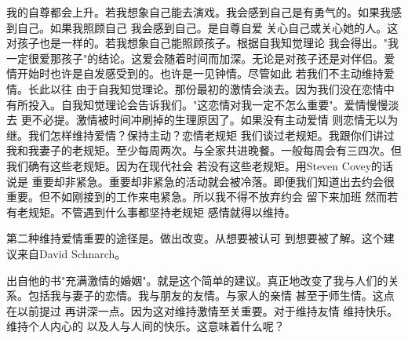 我的自尊都会上升。若我想象自己能去演戏。我会感到自己是有勇气的。如果我感到自己。如果我照顾自己 我会感到自己。是自尊自爱 关心自己或关心她的人。这对孩子也是一样的。若我想象自己能照顾孩子。根据自我知觉理论 我会得出。"我一定很爱那孩子"的结论。这爱会随着时间而加深。无论是对孩子还是对伴侣。爱情开始时也许是自发感受到的。也许是一见钟情。尽管如此 若我们不主动维持爱情。长此以往 由于自我知觉理论。那份最初的激情会淡去。因为我们没在恋情中有所投入。自我知觉理论会告诉我们。"这恋情对我一定不怎么重要"。爱情慢慢淡去 更不必提。激情被时间冲刷掉的生理原因了。如果没有主动爱情 则恋情无以为继。我们怎样维持爱情？保持主动？恋情老规矩 我们谈过老规矩。我跟你们讲过我和我妻子的老规矩。至少每周两次。与全家共进晚餐。一般每周会有三四次。但我们确有这些老规矩。因为在现代社会 若没有这些老规矩。用Steven Covey的话说是 重要却非紧急。重要却非紧急的活动就会被冷落。即便我们知道出去约会很重要。但不如刚接到的工作来电紧急。所以我不得不放弃约会 留下来加班 然而若有老规矩。不管遇到什么事都坚持老规矩 感情就得以维持。 

第二种维持爱情重要的途径是。做出改变。从想要被认可 到想要被了解。这个建议来自David Schnarch。 

出自他的书"充满激情的婚姻"。就是这个简单的建议。真正地改变了我与人们的关系。包括我与妻子的恋情。我与朋友的友情。与家人的亲情 甚至于师生情。这点在以前提过 再讲深一点。因为这对维持激情至关重要。对于维持友情 维持快乐。维持个人内心的 以及人与人间的快乐。这意味着什么呢？ 

